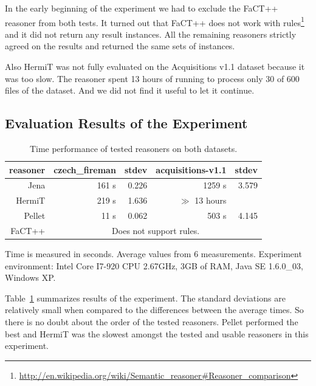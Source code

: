 \documentclass[10pt, conference, compsocconf]{IEEEtran}
\begin{document}
In the early beginning of the experiment we had to exclude the FaCT++ reasoner from both tests. It turned out that FaCT++ does not work with rules\footnote{\url{http://en.wikipedia.org/wiki/Semantic_reasoner#Reasoner_comparison}} and it did not return any result instances.  All the remaining reasoners strictly agreed on the results and returned the same sets of instances.

Also HermiT was not fully evaluated on the Acquisitions v1.1 dataset because it was too slow. The reasoner spent 13 hours of running to process only 30 of 600 files of the dataset. And we did not find it useful to let it continue.












\subsection{Evaluation Results of the Experiment}






\begin{table}
\begin{center}
\begin{tabular}{|r||r|r||r|r|}
\hline
reasoner & \textbf{czech\_fireman} & stdev & \textbf{acquisitions-v1.1} & stdev\\
\hline
\hline
Jena & 161 s & 0.226 & 1259 s & 3.579\\
\hline
HermiT & 219 s & 1.636 & $\gg$ 13 hours & \\
\hline
Pellet & 11 s & 0.062 & 503 s & 4.145\\
\hline
FaCT++ & \multicolumn{4}{|c|}{Does not support rules.}\\
\hline
\end{tabular}
\end{center}

Time is measured in seconds. Average values from 6 measurements. Experiment environment: Intel Core I7-920 CPU 2.67GHz, 3GB of RAM, Java SE 1.6.0\_03, Windows XP.

\caption{Time performance of tested reasoners on both datasets.}
\label{tab:results}
\end{table}

Table~\ref{tab:results} summarizes results of the experiment. The standard deviations are relatively small when compared to the differences between the average times.  So there is no doubt about the order of the tested reasoners. Pellet performed the best and HermiT was the slowest amongst the tested and usable reasoners in this experiment.
\end{document}
